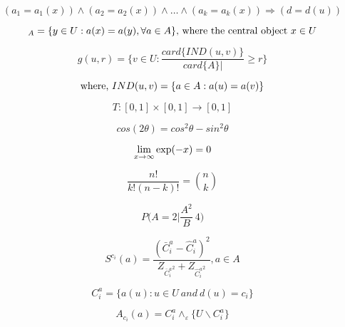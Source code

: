 \documentclass[a4paper,12pt]{article}
\begin{document}
\begin{equation}
(a_1=a_1(x))\wedge(a_2=a_2(x))\wedge\dots\wedge(a_k=a_k(x))\Rightarrow(d=d(u))
\label{eq:rownanie}
\end{equation}

\begin{equation}
[x]_A=\{y\in U:a(x)=a(y),\forall a \in A \} \textnormal{, where the central object} \  x \in U
\label{eq:rownanie}
\end{equation}

\begin{equation}
g(u,r)=\{v \in U: \frac{card\{IND(u,v)\}}{card\{A\}|} \geq r \}
\label{eq:rownanie}
\end{equation}

\begin{equation}
\textnormal{where,} \ IND(u,v)= \{ a \in A:a(u)=a(v) \}
\label{eq:rownanie}
\end{equation}

\begin{equation}
T:[0,1] \times [0,1] \rightarrow [0,1]
\label{eq:rownanie}
\end{equation}

\begin{equation}
cos(2\theta )=cos^2\theta - sin^2\theta
\label{eq:rownanie}
\end{equation}

\begin{equation}
\lim\limits_{x \to \infty} \textnormal{exp}(-x)=0
\label{eq:rownanie}
\end{equation}

\begin{equation}
\frac{n!}{k!(n-k)!}={n\choose k}
\label{eq:rownanie}
\end{equation}

\begin{equation}
P\Bigg(A=2\Bigg|\frac{A^2}{B} \> 4 \Bigg)
\label{eq:rownanie}
\end{equation}

\begin{equation}
S^{c_i}(a)=\frac{(\bar{C}^a_i-\hat{C}^a_i)^2}{Z_{{\bar{C}^a_i}^2}+Z_{{\hat{C}^a_i}^2}},a \in A
\label{eq:rownanie}
\end{equation}

\begin{equation}
C^a_i=\{a(u):u\in U \ and \ d(u) =c_i\}
\label{eq:rownanie}
\end{equation}

\begin{equation}
A_{c_i}(a)=C^a_i \wedge_\varepsilon \{U\backslash C^a_i\}
\label{eq:rownanie}
\end{equation}
\end{document}
